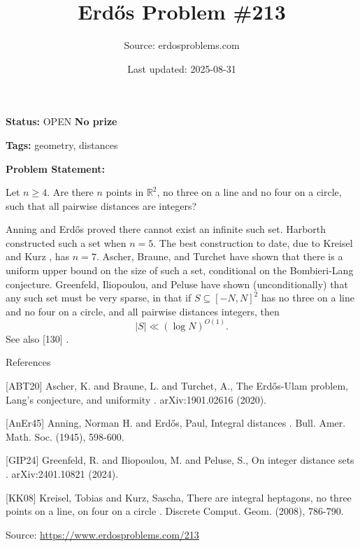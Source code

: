\documentclass{article}
\title{Erd\H{o}s Problem \#213}
\date{Last updated: 2025-08-31}
\author{Source: erdosproblems.com}
\begin{document}
\maketitle

\noindent\textbf{Status:} OPEN \quad \textbf{No prize}

\noindent\textbf{Tags:} geometry, distances

\medskip

\noindent\textbf{Problem Statement:}

Let $n\geq 4$. Are there $n$ points in $\mathbb{R}^2$, no three on a line and no four on a circle, such that all pairwise distances are integers?




Anning and Erd\H{o}s \cite{AnEr45} proved there cannot exist an infinite such set. Harborth constructed such a set when $n=5$. The best construction to date, due to Kreisel and Kurz \cite{KK08}, has $n=7$. Ascher, Braune, and Turchet \cite{ABT20} have shown that there is a uniform upper bound on the size of such a set, conditional on the Bombieri-Lang conjecture. Greenfeld, Iliopoulou, and Peluse \cite{GIP24} have shown (unconditionally) that any such set must be very sparse, in that if $S\subseteq [-N,N]^2$ has no three on a line and no four on a circle, and all pairwise distances integers, then\[\lvert S\rvert \ll (\log N)^{O(1)}.\]See also [130] .




References

[ABT20] Ascher, K. and Braune, L. and Turchet, A., The Erd\H{o}s-Ulam problem, Lang's conjecture, and uniformity . arXiv:1901.02616 (2020).

[AnEr45] Anning, Norman H. and Erd\H{o}s, Paul, Integral distances . Bull. Amer. Math. Soc. (1945), 598-600.

[GIP24] Greenfeld, R. and Iliopoulou, M. and Peluse, S., On integer distance sets . arXiv:2401.10821 (2024).

[KK08] Kreisel, Tobias and Kurz, Sascha, There are integral heptagons, no three points on a line, on four on a circle . Discrete Comput. Geom. (2008), 786-790.


\bigskip
\noindent\small{Source: \url{https://www.erdosproblems.com/213}}
\end{document}

